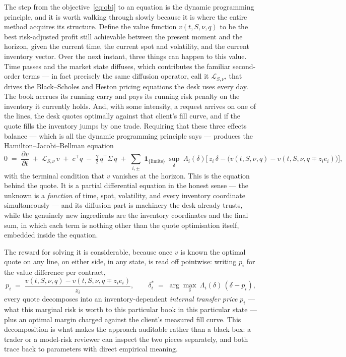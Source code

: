 \documentclass[11pt,a4paper]{article}
\begin{document}
The step from the objective~\eqref{eq:obj} to an equation is the dynamic
programming principle, and it is worth walking through slowly because it
is where the entire method acquires its structure. Define the value
function $v(t,S,\nu,q)$ to be the best risk-adjusted profit still
achievable between the present moment and the horizon, given the current
time, the current spot and volatility, and the current inventory vector.
Over the next instant, three things can happen to this value. Time
passes and the market state diffuses, which contributes the familiar
second-order terms --- in fact precisely the same diffusion operator,
call it $\mathcal L_{S,\nu}$, that drives the Black--Scholes and Heston
pricing equations the desk uses every day. The book accrues its running
carry and pays its running risk penalty on the inventory it currently
holds. And, with some intensity, a request arrives on one of the lines,
the desk quotes optimally against that client's fill curve, and if the
quote fills the inventory jumps by one trade. Requiring that these three
effects balance --- which is all the dynamic programming principle says
--- produces the Hamilton--Jacobi--Bellman equation
\begin{equation}
0 \;=\; \frac{\partial v}{\partial t}
\;+\;\mathcal L_{S,\nu}\,v
\;+\;c^{\!\top}q\;-\;\tfrac{\gamma}{2}\,q^{\top}\Sigma\,q
\;+\;\sum_{i,\pm}\;
\mathbf 1_{\{\text{limits}\}}\,
\sup_{\delta}\;\Lambda_i(\delta)\Big[\,z_i\,\delta
-\big(v(t,S,\nu,q)-v(t,S,\nu,q\mp z_i e_i)\big)\Big],
\label{eq:hjb}
\end{equation}
with the terminal condition that $v$ vanishes at the horizon. This is
the equation behind the quote. It is a partial differential equation in
the honest sense --- the unknown is a \emph{function} of time, spot,
volatility, and every inventory coordinate simultaneously --- and its
diffusion part is machinery the desk already trusts, while the genuinely
new ingredients are the inventory coordinates and the final sum, in
which each term is nothing other than the quote optimisation itself,
embedded inside the equation.

The reward for solving it is considerable, because once $v$ is known the
optimal quote on any line, on either side, in any state, is read off
pointwise: writing $p_i$ for the value difference per contract,
\begin{equation}
p_i \;=\; \frac{v(t,S,\nu,q)-v(t,S,\nu,q\mp z_i e_i)}{z_i},
\qquad
\delta_i^{*}\;=\;\arg\max_{\delta}\ \Lambda_i(\delta)\,(\delta-p_i),
\label{eq:quote}
\end{equation}
every quote decomposes into an inventory-dependent \emph{internal
transfer price} $p_i$ --- what this marginal risk is worth to this
particular book in this particular state --- plus an optimal margin
charged against the client's measured fill curve. This decomposition is
what makes the approach auditable rather than a black box: a trader or a
model-risk reviewer can inspect the two pieces separately, and both trace
back to parameters with direct empirical meaning.
\end{document}
